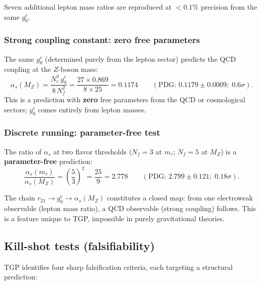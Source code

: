 \noindent
Seven additional lepton mass ratios are reproduced at
$<0.1\%$ precision from the same $g_{0}^{e}$.

\subsubsection{Strong coupling constant: zero free parameters}

The same $g_{0}^{e}$ (determined purely from the lepton sector)
predicts the QCD coupling at the $Z$-boson mass:
\begin{equation}\label{eq:alphas}
  \alpha_{s}(M_{Z})
  = \frac{N_{c}^{3}\,g_{0}^{e}}{8\,N_{f}^{2}}
  = \frac{27 \times 0.869}{8 \times 25}
  = 0.1174
  \qquad (\text{PDG: } 0.1179 \pm 0.0009;\; 0.6\sigma).
\end{equation}
This is a prediction with \textbf{zero} free parameters from the
QCD or cosmological sectors; $g_{0}^{e}$ comes entirely from lepton
masses.

\subsubsection{Discrete running: parameter-free test}

The ratio of $\alpha_{s}$ at two flavor thresholds
($N_{f}=3$ at $m_{\tau}$; $N_{f}=5$ at $M_{Z}$) is a
\textbf{parameter-free} prediction:
\begin{equation}\label{eq:running-ratio}
  \frac{\alpha_{s}(m_{\tau})}{\alpha_{s}(M_{Z})}
  = \left(\frac{5}{3}\right)^{2}
  = \frac{25}{9}
  = 2.778
  \qquad (\text{PDG: } 2.799 \pm 0.121;\; 0.18\sigma).
\end{equation}

\begin{remark}[Implication]\label{rem:lepton-qcd}
The chain $r_{21}\to g_{0}^{e}\to\alpha_{s}(M_{Z})$ constitutes
a closed map: from one electroweak observable (lepton mass ratio),
a QCD observable (strong coupling) follows.  This is a feature
unique to TGP, impossible in purely gravitational theories.
\end{remark}

\subsection{Kill-shot tests (falsifiability)}\label{ssec:killshots}

TGP identifies four sharp falsification criteria, each targeting
a structural prediction:

